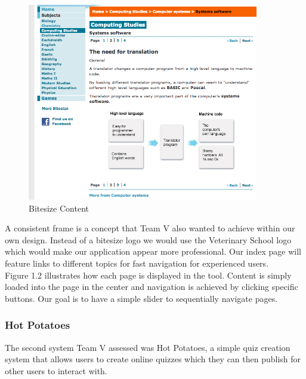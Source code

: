 \documentclass{l3proj}
\begin{document}
\begin{figure}[!ht]
\caption{Bitesize Content}
 \centering
\includegraphics[width=0.9\textwidth]{images/Bitesize/BitesizeContent.png}
\end{figure}

A consistent frame is a concept that Team V also wanted to achieve
within our own design. Instead of a bitesize logo we would use the
Veterinary School logo which would make our application appear more
professional. Our index page will feature links to different topics
for fast navigation for experienced users.\\


Figure 1.2 illustrates how each page is displayed in the tool. Content
is simply loaded into the page in the center and navigation is
achieved by clicking specific buttons. Our goal is to have a simple
slider to sequentially navigate pages.\\
\newpage
\subsubsection{Hot Potatoes}

The second system Team V assessed was Hot Potatoes, a simple quiz
creation system that allows users to create online quizzes which they
can then publish for other users to interact with.\\ 
\end{document}
